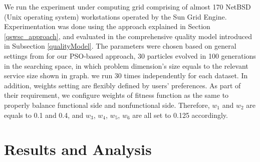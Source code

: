 \documentclass{llncs}
\begin{document}
We run the experiment under computing grid comprising of almost 170 NetBSD (Unix operating system) workstations operated by the Sun Grid Engine. Experimentation was done using the approach explained in Section \ref{qswsc_approach}, and evaluated in the comprehensive quality model introduced in Subsection \ref{qualityModel}. The parameters were chosen based on general settings from \cite{shi2001particle} for our PSO-based approach, 30 particles evolved in 100 generations in the searching space, in which problem dimension's size equals to the relevant service size shown in graph. we run 30 times independently for each dataset. In addition, weights setting are flexibly defined by users' preferences. As part of their requirement, we configure weights of fitness function as the same to properly balance functional side and nonfunctional side. Therefore, $w_{1}$ and $w_{2}$ are equals to 0.1 and 0.4,  and $w_{3}$, $w_{4}$, $w_{5}$, $w_{6}$ are all set to 0.125 accordingly.

\section{Results and Analysis}\label{results_analysis}
\end{document}
